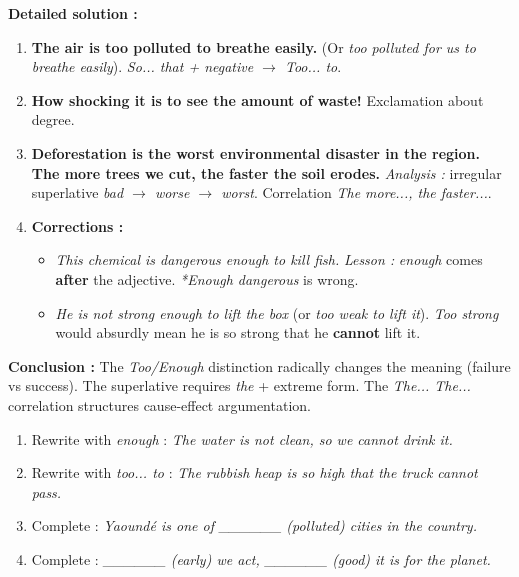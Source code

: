 \documentclass[11pt]{article}
\newcommand{\cle}[1]{{\popxbold\color{popdark}#1}}
\begin{document}
\begin{exoresolu}
\tcblower
\textbf{Detailed solution :}
\begin{enumerate}
    \item \textbf{The air is \cle{too polluted to breathe} easily.} (Or \textit{too polluted for us to breathe easily}). \textit{So... that + negative $\rightarrow$ Too... to}.
    \item \textbf{\cle{How shocking} it is to see the amount of waste!} Exclamation about degree.
    \item \textbf{Deforestation is \cle{the worst} environmental disaster in the region. \cle{The more} trees we cut, \cle{the faster} the soil erodes.}
    \textit{Analysis :} irregular superlative \textit{bad $\rightarrow$ worse $\rightarrow$ worst}. Correlation \textit{The more..., the faster...}.
    \item \textbf{Corrections :}
    \begin{itemize}
        \item \textit{This chemical is \cle{dangerous enough to kill} fish.} \textit{Lesson :} \textit{enough} comes \textbf{after} the adjective. \textit{*Enough dangerous} is wrong.
        \item \textit{He is \cle{not strong enough to lift} the box} (or \textit{too weak to lift it}). \textit{Too strong} would absurdly mean he is so strong that he \textbf{cannot} lift it.
    \end{itemize}
\end{enumerate}
\textbf{Conclusion :} The \textit{Too/Enough} distinction radically changes the meaning (failure vs success). The superlative requires \textit{the} + extreme form. The \textit{The... The...} correlation structures cause-effect argumentation.
\end{exoresolu}

\begin{exercice}
\begin{enumerate}
    \item Rewrite with \textit{enough} : \textit{The water is not clean, so we cannot drink it.}
    \item Rewrite with \textit{too... to} : \textit{The rubbish heap is so high that the truck cannot pass.}
    \item Complete : \textit{Yaoundé is one of \_\_\_\_\_\_ (polluted) cities in the country.}
    \item Complete : \textit{\_\_\_\_\_\_ (early) we act, \_\_\_\_\_\_ (good) it is for the planet.}
\end{enumerate}
\end{exercice}
\end{document}
